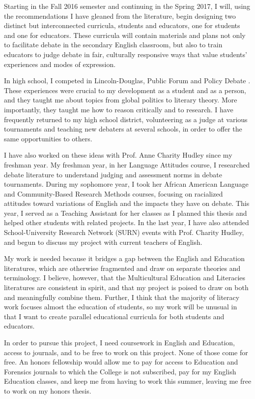 \documentclass[doc,12pt,natbib]{apa6}
\begin{document}
Starting in the Fall 2016 semester and continuing in the Spring 2017, I will,
using the recommendations I have gleaned from the literature, begin designing
two distinct but interconnected curricula, students and educators, one for
students and one for educators. These curricula will contain materials and
plans not only to facilitate debate in the secondary English classroom, but
also to train educators to judge debate in fair, culturally responsive ways
that value students' experiences and modes of expression.

In high school, I competed in Lincoln-Douglas, Public Forum and Policy Debate
\citep{Lawson94}.  These experiences were crucial to my development as a
student and as a person, and they taught me about topics from global politics
to literary theory. More importantly, they taught me how to reason critically
and to research. I have frequently returned to my high school district,
volunteering as a judge at various tournaments and teaching new debaters at
several schools, in order to offer the same opportunities to others.

I have also worked on these ideas with Prof. Anne Charity Hudley since my
freshman year. My freshman year, in her Language Attitudes course, I researched
debate literature to understand judging and assessment norms in debate
tournaments. During my sophomore year, I took her African American Language and
Community-Based Research Methods courses, focusing on racialized attitudes
toward variations of English and the impacts they have on debate. This year, I
served as a Teaching Assistant for her classes as I planned this thesis and
helped other students with related projects. In the last year, I have also
attended School-University Research Network (SURN) events with Prof. Charity
Hudley, and begun to discuss my project with current teachers of English.

My work is needed because it bridges a gap between the English and Education
literatures, which are otherwise fragmented and draw on separate theories and
terminology.  I believe, however, that the Multicultural Education and
Literacies literatures are consistent in spirit, and that my project is poised
to draw on both and meaningfully combine them. Further, I think that the
majority of literacy work focuses almost the education of students, so my work
will be unusual in that I want to create parallel educational curricula for
both students and educators.

In order to pursue this project, I need coursework in English and Education,
access to journals, and to be free to work on this project. None of those come
for free. An honors fellowship would allow me to pay for access to Education
and Forensics journals to which the College is not subscribed, pay for my
English Education classes, and keep me from having to work this summer, leaving
me free to work on my honors thesis.

\clearpage

\end{document}
